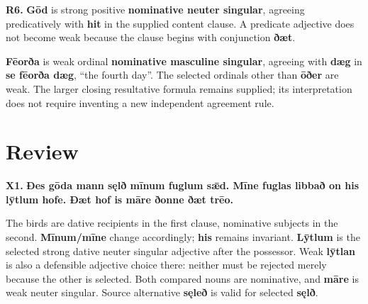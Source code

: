 \par\begin{minipage}{\linewidth}\raggedright
\textbf{R6.} \textbf{Gōd} is strong positive \textbf{nominative neuter singular}, agreeing predicatively with \textbf{hit} in the supplied content clause. A predicate adjective does not become weak because the clause begins with conjunction \textbf{ðæt}.

\textbf{Fēorða} is weak ordinal \textbf{nominative masculine singular}, agreeing with \textbf{dæg} in \textbf{se fēorða dæg}, “the fourth day”. The selected ordinals other than \textbf{ōðer} are weak. The larger closing resultative formula remains supplied; its interpretation does not require inventing a new independent agreement rule.

\end{minipage}\par\addvspace{4pt}

\section*{Review}

\par\begin{minipage}{\linewidth}\raggedright
\textbf{X1.} \textbf{Ðes gōda mann sęlð mīnum fuglum sǣd. Mīne fuglas libbað on his lȳtlum hofe. Ðæt hof is māre ðonne ðæt trēo.}

The birds are dative recipients in the first clause, nominative subjects in the second. \textbf{Mīnum/\allowbreak{}mīne} change accordingly; \textbf{his} remains invariant. \textbf{Lȳtlum} is the selected strong dative neuter singular adjective after the possessor. Weak \textbf{lȳtlan} is also a defensible adjective choice there: neither must be rejected merely because the other is selected. Both compared nouns are nominative, and \textbf{māre} is weak neuter singular. Source alternative \textbf{sęleð} is valid for selected \textbf{sęlð}.

\end{minipage}\par\addvspace{4pt}

